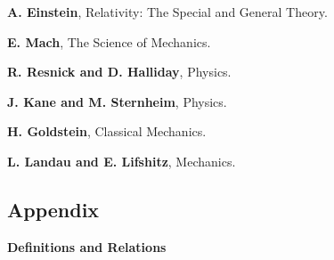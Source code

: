 \documentclass[10pt]{article}
\begin{document}
\vspace{+1.20em}

\par \textbf{A. Einstein}, Relativity: The Special and General Theory.
\bigskip
\par \textbf{E. Mach}, The Science of Mechanics.
\bigskip
\par \textbf{R. Resnick and D. Halliday}, Physics.
\bigskip
\par \textbf{J. Kane and M. Sternheim}, Physics.
\bigskip
\par \textbf{H. Goldstein}, Classical Mechanics.
\bigskip
\par \textbf{L. Landau and E. Lifshitz}, Mechanics.

\newpage

{\centering\subsection*{Appendix}}

\vspace{+1.20em}

\par \hspace{+0.81em} {\fontsize{10.50}{10.50}\selectfont\textbf{Definitions and Relations}}

\vspace{+1.02em}
\end{document}
